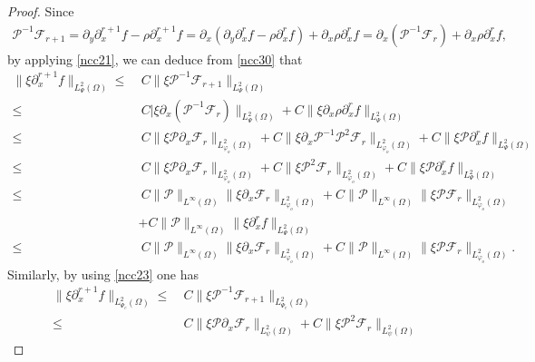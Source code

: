\documentclass{amsart}
\numberwithin{equation}{section}
\begin{document}
\begin{proof}
Since
\begin{align}\label{ncc30}
\mathcal{P}^{-1}\mathcal{F}_{r+1}
=\partial_{y}\partial_{x}^{r+1}f-\rho\partial_{x}^{r+1}f
=\partial_{x}(\partial_{y}\partial_{x}^{r}f-\rho\partial_{x}^{r}f)+\partial_{x}\rho\partial_{x}^{r}f
=\partial_{x}(\mathcal{P}^{-1}\mathcal{F}_{r})+\partial_{x}\rho\partial_{x}^{r}f,
\end{align}
by applying \eqref{ncc21}, we can deduce from \eqref{ncc30} that
\begin{align}\label{ncc31}
\|\xi\partial_{x}^{r+1}f\|_{L_{\Psi}^{2}(\Omega)}
\leq&~C\|\xi\mathcal{P}^{-1}\mathcal{F}_{r+1}\|_{L_{\Psi}^{2}(\Omega)}\\
\leq&~C|\xi\partial_{x}(\mathcal{P}^{-1}\mathcal{F}_{r})\|_{L_{\Psi}^{2}(\Omega)}
     +C\|\xi\partial_{x}\rho\partial_{x}^{r}f\|_{L_{\Psi}^{2}(\Omega)}\nonumber\\
\leq&~C\|\xi\mathcal{P}\partial_{x}\mathcal{F}_{r}\|_{L_{\varphi_{o}}^{2}(\Omega)}
     +C\|\xi\partial_{x}\mathcal{P}^{-1}\mathcal{P}^{2}\mathcal{F}_{r}\|_{L_{\varphi_{o}}^{2}(\Omega)}
     +C\|\xi\mathcal{P}\partial_{x}^{r}f\|_{L_{\Psi}^{2}(\Omega)}\nonumber\\
\leq&~C\|\xi\mathcal{P}\partial_{x}\mathcal{F}_{r}\|_{L_{\varphi_{o}}^{2}(\Omega)}
     +C\|\xi\mathcal{P}^{2}\mathcal{F}_{r}\|_{L_{\varphi_{o}}^{2}(\Omega)}
     +C\|\xi\mathcal{P}\partial_{x}^{r}f\|_{L_{\Psi}^{2}(\Omega)}\nonumber\\
\leq&~C\|\mathcal{P}\|_{L^{\infty}(\Omega)}\|\xi\partial_{x}\mathcal{F}_{r}\|_{L_{\varphi_{o}}^{2}(\Omega)}
     +C\|\mathcal{P}\|_{L^{\infty}(\Omega)}\|\xi\mathcal{P}\mathcal{F}_{r}\|_{L_{\varphi_{o}}^{2}(\Omega)}\nonumber\\
    &+C\|\mathcal{P}\|_{L^{\infty}(\Omega)}\|\xi\partial_{x}^{r}f\|_{L_{\Psi}^{2}(\Omega)}\nonumber\\
\leq&~C\|\mathcal{P}\|_{L^{\infty}(\Omega)}\|\xi\partial_{x}\mathcal{F}_{r}\|_{L_{\varphi_{o}}^{2}(\Omega)}
     +C\|\mathcal{P}\|_{L^{\infty}(\Omega)}\|\xi\mathcal{P}\mathcal{F}_{r}\|_{L_{\varphi_{o}}^{2}(\Omega)}.\nonumber
\end{align}
Similarly, by using \eqref{ncc23} one has
\begin{align}\label{ncc32}
\|\xi\partial_{x}^{r+1}f\|_{L_{\Psi_{c}}^{2}(\Omega)}
\leq&~C\|\xi\mathcal{P}^{-1}\mathcal{F}_{r+1}\|_{L_{\Psi_{c}}^{2}(\Omega)}\\
\leq&~C\|\xi\mathcal{P}\partial_{x}\mathcal{F}_{r}\|_{L_{\psi}^{2}(\Omega)}
     +C\|\xi\mathcal{P}^{2}\mathcal{F}_{r}\|_{L_{\psi}^{2}(\Omega)}

\end{align}
\end{proof}
\end{document}
